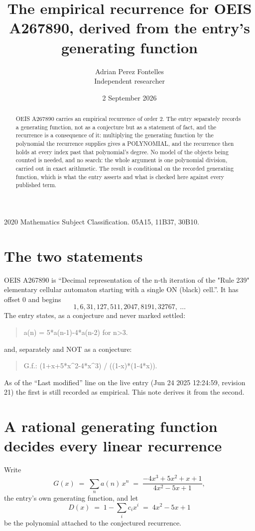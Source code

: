\documentclass[11pt,a4paper]{article}
\title{The empirical recurrence for OEIS A267890, derived from the entry's generating function}
\author{Adrian Perez Fontelles\\ \small Independent researcher}
\date{2 September 2026}
\theoremstyle{plain}
\theoremstyle{definition}
\begin{document}
\maketitle

\begin{abstract}
OEIS A267890 carries an empirical recurrence of order $2$. The entry separately records a
generating function, not as a conjecture but as a statement of fact, and the recurrence is a
consequence of it: multiplying the generating function by the polynomial the recurrence
supplies gives a POLYNOMIAL, and the recurrence then holds at every index past that
polynomial's degree. No model of the objects being counted is needed, and no search: the
whole argument is one polynomial division, carried out in exact arithmetic. The result is
conditional on the recorded generating function, which is what the entry asserts and what is
checked here against every published term.
\end{abstract}

\noindent\small 2020 Mathematics Subject Classification. 05A15, 11B37, 30B10.\normalsize

\section{The two statements}

OEIS A267890 is ``Decimal representation of the n-th iteration of the "Rule 239" elementary cellular automaton starting with a single ON (black) cell.''. It has offset $0$ and begins
\[
1, 6, 31, 127, 511, 2047, 8191, 32767,\ \dots
\]
The entry states, as a conjecture and never marked settled:
\begin{quote}
a(n) = 5*a(n-1)-4*a(n-2) for n>3.
\end{quote}
and, separately and NOT as a conjecture:
\begin{quote}
G.f.: (1+x+5*x\^{}2-4*x\^{}3) / ((1-x)*(1-4*x)).
\end{quote}
As of the ``Last modified'' line on the live entry (Jun 24 2025 12:24:59, revision 21) the first is still
recorded as empirical. This note derives it from the second.

\section{A rational generating function decides every linear recurrence}

Write
\[
G(x)\;=\;\sum_{n}a(n)\,x^{n}\;=\;\frac{- 4 x^{3} + 5 x^{2} + x + 1}{4 x^{2} - 5 x + 1},
\]
the entry's own generating function, and let
\[
D(x)\;=\;1-\sum_i c_i x^{i}\;=\;4 x^{2} - 5 x + 1
\]
be the polynomial attached to the conjectured recurrence.
\end{document}
